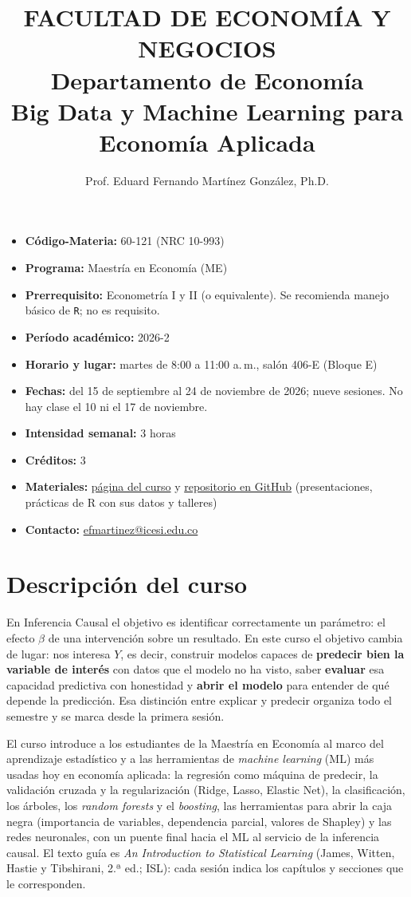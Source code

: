 \documentclass[12pt,a4paper]{article}
\title{\textbf{FACULTAD DE ECONOMÍA Y NEGOCIOS \\ Departamento de Economía} \\
Big Data y Machine Learning para Economía Aplicada}
\author{Prof. Eduard Fernando Martínez González, Ph.D.}
\date{}
\begin{document}
\maketitle
\begin{itemize}
\item \textbf{Código-Materia:} 60-121 (NRC 10-993)
\item \textbf{Programa:} Maestría en Economía (ME)
\item \textbf{Prerrequisito:} Econometría I y II (o equivalente). Se recomienda manejo básico de \texttt{R}; no es requisito.
\item \textbf{Período académico:} 2026-2
\item \textbf{Horario y lugar:} martes de 8:00 a 11:00 a.\,m., salón 406-E (Bloque E)
\item \textbf{Fechas:} del 15 de septiembre al 24 de noviembre de 2026; nueve sesiones. No hay clase el 10 ni el 17 de noviembre.
\item \textbf{Intensidad semanal:} 3 horas
\item \textbf{Créditos:} 3
\item \textbf{Materiales:} \href{https://eduard-martinez.github.io/teaching/bdml-applied-economics/}{página del curso} y \href{https://github.com/eduard-martinez/bdml-applied-economics}{repositorio en GitHub} (presentaciones, prácticas de R con sus datos y talleres)
\item \textbf{Contacto:} \href{mailto:efmartinez@icesi.edu.co}{efmartinez@icesi.edu.co}
\end{itemize}

\section{Descripción del curso}

En Inferencia Causal el objetivo es identificar correctamente un parámetro: el efecto $\beta$ de una intervención sobre un resultado. En este curso el objetivo cambia de lugar: nos interesa $Y$, es decir, construir modelos capaces de \textbf{predecir bien la variable de interés} con datos que el modelo no ha visto, saber \textbf{evaluar} esa capacidad predictiva con honestidad y \textbf{abrir el modelo} para entender de qué depende la predicción. Esa distinción entre explicar y predecir organiza todo el semestre y se marca desde la primera sesión.

El curso introduce a los estudiantes de la Maestría en Economía al marco del aprendizaje estadístico y a las herramientas de \emph{machine learning} (ML) más usadas hoy en economía aplicada: la regresión como máquina de predecir, la validación cruzada y la regularización (Ridge, Lasso, Elastic Net), la clasificación, los árboles, los \emph{random forests} y el \emph{boosting}, las herramientas para abrir la caja negra (importancia de variables, dependencia parcial, valores de Shapley) y las redes neuronales, con un puente final hacia el ML al servicio de la inferencia causal. El texto guía es \emph{An Introduction to Statistical Learning} (James, Witten, Hastie y Tibshirani, 2.ª ed.; ISL): cada sesión indica los capítulos y secciones que le corresponden.
\end{document}
